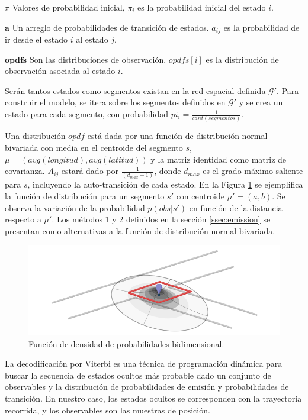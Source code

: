 \textbf{$\pi$} Valores de probabilidad inicial, $\pi_i$ es la probabilidad inicial del estado $i$.

$\textbf{a}$ Un arreglo de probabilidades de transición de estados. $a_{ij}$ es la probabilidad de ir desde el estado $i$ al estado $j$.

$\textbf{opdfs}$ Son las distribuciones de observación, $opdfs[i]$ es la distribución de observación asociada al estado $i$.

Serán tantos estados como segmentos existan en la red espacial definida  $\mathcal{G'}$. Para construir el modelo, se itera sobre los segmentos definidos en \(\mathcal{G'}\) y se crea un estado para cada segmento, con probabilidad $pi_i = \frac{1}{cant(segmentos)}$. 

Una distribución $opdf$ está dada por una función de distribución normal bivariada con media en el centroide del segmento $s$, $\mu = (avg(longitud),avg(latitud))$ y la matriz identidad como matriz de covarianza. $A_{ij}$ estará dado por $\frac{1}{(d_{max}+1)}$, donde $d_{max}$ es el grado máximo saliente para $s$, incluyendo la auto-transición de cada estado.
En la Figura \ref{fig:opdf} se ejemplifica la función de distribución para un segmento $s'$ con centroide $\mu'= (a,b)$. Se observa la variación de la probabilidad $p(obs|s')$ en función de la distancia respecto a $\mu'$. Los métodos 1 y 2 definidos en la sección \ref{ssec:emission} se presentan como alternativas a la función de distribución normal bivariada.

\begin{figure}[!htp]
	\centering
	\includegraphics[scale=0.5]{images/gaussian-sq.png}
    \caption{Función de densidad de probabilidades bidimensional.}
    \label{fig:opdf}
\end{figure}

La decodificación por Viterbi es una técnica de programación dinámica para buscar la secuencia de estados ocultos más probable dado un conjunto de observables y la distribución de probabilidades de emisión y probabilidades de transición. En nuestro caso, los estados ocultos se corresponden con la trayectoria recorrida, y los observables son las muestras de posición.

